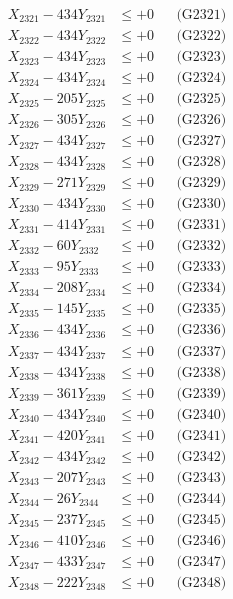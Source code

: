 \documentclass[a4paper,10pt]{article}
\begin{document}
{\begin{align}
\allowbreak
X_{2321} - 434Y_{2321} &\leq +0 && \text{(G2321)} \\
X_{2322} - 434Y_{2322} &\leq +0 && \text{(G2322)} \\
X_{2323} - 434Y_{2323} &\leq +0 && \text{(G2323)} \\
X_{2324} - 434Y_{2324} &\leq +0 && \text{(G2324)} \\
X_{2325} - 205Y_{2325} &\leq +0 && \text{(G2325)} \\
X_{2326} - 305Y_{2326} &\leq +0 && \text{(G2326)} \\
X_{2327} - 434Y_{2327} &\leq +0 && \text{(G2327)} \\
X_{2328} - 434Y_{2328} &\leq +0 && \text{(G2328)} \\
X_{2329} - 271Y_{2329} &\leq +0 && \text{(G2329)} \\
X_{2330} - 434Y_{2330} &\leq +0 && \text{(G2330)} \\
\allowbreak
X_{2331} - 414Y_{2331} &\leq +0 && \text{(G2331)} \\
X_{2332} - 60Y_{2332} &\leq +0 && \text{(G2332)} \\
X_{2333} - 95Y_{2333} &\leq +0 && \text{(G2333)} \\
X_{2334} - 208Y_{2334} &\leq +0 && \text{(G2334)} \\
X_{2335} - 145Y_{2335} &\leq +0 && \text{(G2335)} \\
X_{2336} - 434Y_{2336} &\leq +0 && \text{(G2336)} \\
X_{2337} - 434Y_{2337} &\leq +0 && \text{(G2337)} \\
X_{2338} - 434Y_{2338} &\leq +0 && \text{(G2338)} \\
X_{2339} - 361Y_{2339} &\leq +0 && \text{(G2339)} \\
X_{2340} - 434Y_{2340} &\leq +0 && \text{(G2340)} \\
\allowbreak
X_{2341} - 420Y_{2341} &\leq +0 && \text{(G2341)} \\
X_{2342} - 434Y_{2342} &\leq +0 && \text{(G2342)} \\
X_{2343} - 207Y_{2343} &\leq +0 && \text{(G2343)} \\
X_{2344} - 26Y_{2344} &\leq +0 && \text{(G2344)} \\
X_{2345} - 237Y_{2345} &\leq +0 && \text{(G2345)} \\
X_{2346} - 410Y_{2346} &\leq +0 && \text{(G2346)} \\
X_{2347} - 433Y_{2347} &\leq +0 && \text{(G2347)} \\
X_{2348} - 222Y_{2348} &\leq +0 && \text{(G2348)} \\

\end{align}}
\end{document}

